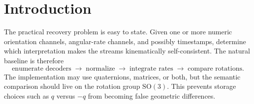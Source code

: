 \documentclass[11pt]{article}
\newcommand{\SO}{\mathrm{SO}(3)}
\begin{document}
\begin{abstract}
        The single-trajectory engine is also given a product boundary. It emits a versioned
        \emph{evidence packet} containing quotient-class-relative evidence, the local prior that
        was used, calibration and observability descriptors, hard metadata, provenance, and
        lineage. A separate cohort-fusion service can then borrow information from strong
        reference packets to classify a weak target packet without double-counting priors or
        silently multiplying dependent evidence. Three transfer models are distinguished: one
        fixed convention shared by all members, an exchangeable partially pooled cohort, and a
        robust sharedness mixture that discounts borrowing when the target conflicts with the
        reference cohort. Numerical posterior probabilities are permitted only when the local
        evidence has been calibrated and the packet-dependence assumptions have been audited.

    \end{abstract}

    \tableofcontents


    \section{Introduction}\label{sec:introduction}

    The practical recovery problem is easy to state. Given one or more numeric orientation
    channels, angular-rate channels, and possibly timestamps, determine which interpretation
    makes the streams kinematically self-consistent. The natural baseline is therefore
    \begin{equation}
        \boxed{
            \text{enumerate decoders}
            \;\longrightarrow\;
            \text{normalize}
            \;\longrightarrow\;
            \text{integrate rates}
            \;\longrightarrow\;
            \text{compare rotations}.}
        \label{eq:baseline-idea}
    \end{equation}
    The implementation may use quaternions, matrices, or both, but the semantic comparison
    should live on the rotation group $\SO$. This prevents storage choices such as
    $q$ versus $-q$ from becoming false geometric differences.
\end{document}
